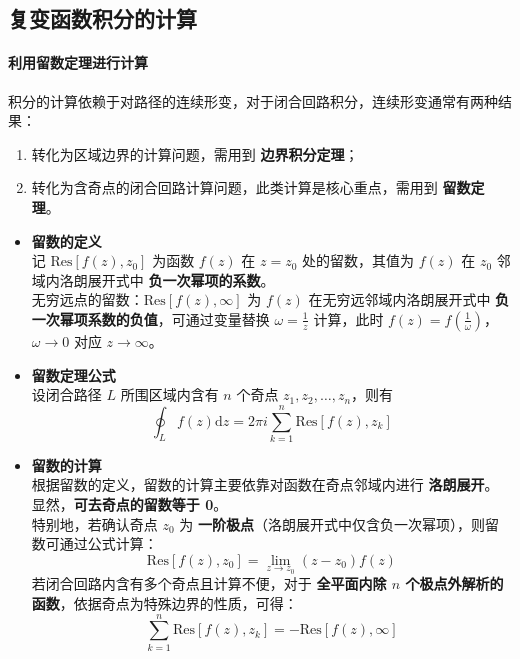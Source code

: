 \documentclass{article}
\begin{document}
	\subsection{复变函数积分的计算}
	\paragraph{利用留数定理进行计算}
	积分的计算依赖于对路径的连续形变，对于闭合回路积分，连续形变通常有两种结果：
	\begin{enumerate}[label=\arabic*., leftmargin=2em]
		\item 转化为区域边界的计算问题，需用到 \textbf{边界积分定理}；
		\item 转化为含奇点的闭合回路计算问题，此类计算是核心重点，需用到 \textbf{留数定理}。
	\end{enumerate}
	
	\begin{itemize}[leftmargin=2em, itemsep=0.5em]
		\item \textbf{留数的定义} \\
		记 $\text{Res}[f(z),z_0]$ 为函数 $f(z)$ 在 $z=z_0$ 处的留数，其值为 $f(z)$ 在 $z_0$ 邻域内洛朗展开式中 \textbf{负一次幂项的系数}。 \\
		无穷远点的留数：$\text{Res}[f(z),\infty]$ 为 $f(z)$ 在无穷远邻域内洛朗展开式中 \textbf{负一次幂项系数的负值}，可通过变量替换 $\omega=\frac{1}{z}$ 计算，此时 $f(z)=f\left(\frac{1}{\omega}\right)$，$\omega\to0$ 对应 $z\to\infty$。
		
		\item \textbf{留数定理公式} \\
		设闭合路径 $L$ 所围区域内含有 $n$ 个奇点 $z_1,z_2,\dots,z_n$，则有
		\[
		\oint_{L}f(z)\mathrm{d}z=2\pi i\sum_{k=1}^{n}\text{Res}[f(z),z_k]
		\]
		
		\item \textbf{留数的计算} \\
		根据留数的定义，留数的计算主要依靠对函数在奇点邻域内进行 \textbf{洛朗展开}。 \\
		显然，\textbf{可去奇点的留数等于 0}。 \\
		特别地，若确认奇点 $z_0$ 为 \textbf{一阶极点}（洛朗展开式中仅含负一次幂项），则留数可通过公式计算：
		\[
		\text{Res}[f(z),z_0]=\lim_{z \to z_0}(z-z_0)f(z)
		\]
		若闭合回路内含有多个奇点且计算不便，对于 \textbf{全平面内除 $n$ 个极点外解析的函数}，依据奇点为特殊边界的性质，可得：
		\[
		\sum_{k=1}^{n}\text{Res}[f(z),z_k]=-\text{Res}[f(z),\infty]
		\]
	\end{itemize}
	
\end{document}
